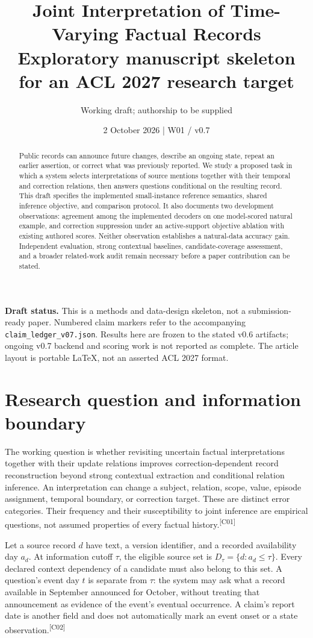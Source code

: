 \documentclass[10pt,letterpaper]{article}
\title{Joint Interpretation of Time-Varying Factual Records\\
\large Exploratory manuscript skeleton for an ACL 2027 research target}
\author{Working draft; authorship to be supplied}
\date{2 October 2026 \quad | \quad W01 / v0.7}
\newcommand{\claim}[1]{\textsuperscript{\scriptsize[#1]}}
\begin{document}
\maketitle
\begin{abstract}
Public records can announce future changes, describe an ongoing state, repeat an
earlier assertion, or correct what was previously reported. We study a proposed
task in which a system selects interpretations of source mentions together with
their temporal and correction relations, then answers questions conditional on
the resulting record. This draft specifies the implemented small-instance
reference semantics, shared inference objective, and comparison protocol. It
also documents two development observations: agreement among the implemented
decoders on one model-scored natural example, and correction suppression under
an active-support objective ablation with existing authored scores. Neither
observation establishes a natural-data accuracy gain. Independent evaluation,
strong contextual baselines, candidate-coverage assessment, and a broader
related-work audit remain necessary before a paper contribution can be stated.
\end{abstract}

\noindent\textbf{Draft status.} This is a methods and data-design skeleton, not a
submission-ready paper. Numbered claim markers refer to the accompanying
\texttt{claim\_ledger\_v07.json}. Results here are frozen to the stated v0.6
artifacts; ongoing v0.7 backend and scoring work is not reported as complete.
The article layout is portable LaTeX, not an asserted ACL 2027 format.

\section{Research question and information boundary}
\label{sec:task}
The working question is whether revisiting uncertain factual interpretations
together with their update relations improves correction-dependent record
reconstruction beyond strong contextual extraction and conditional relation
inference. An interpretation can
change a subject, relation, scope, value, episode assignment, temporal boundary,
or correction target. These are distinct error categories. Their frequency and
their susceptibility to joint inference are empirical questions, not assumed
properties of every factual history.\claim{C01}

Let a source record $d$ have text, a version identifier, and a recorded
availability day $a_d$. At information cutoff $\tau$, the eligible source set is
$D_\tau=\{d:a_d\leq\tau\}$. Every declared context dependency of a candidate
must also belong to this set. A question's event day $t$ is separate from
$\tau$: the system may ask what a record available in September announced for
October, without treating that announcement as evidence of the event's eventual
occurrence. A claim's report date is another field and does not automatically
mark an event onset or a state observation.\claim{C02}
\end{document}
